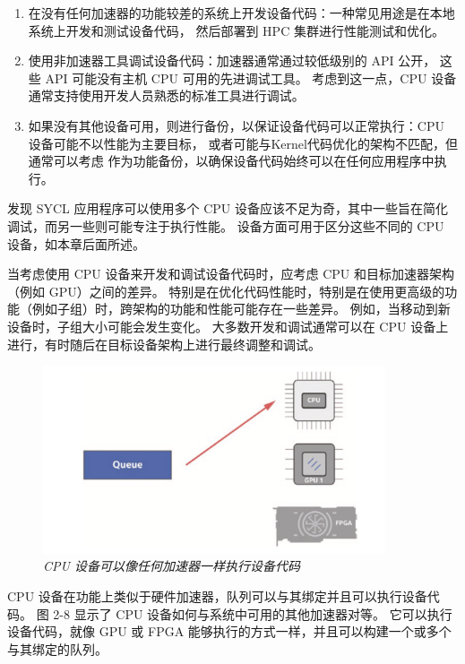 \begin{enumerate}
	\item 在没有任何加速器的功能较差的系统上开发设备代码：一种常见用途是在本地系统上开发和测试设备代码，
	然后部署到 HPC 集群进行性能测试和优化。

	\item 使用非加速器工具调试设备代码：加速器通常通过较低级别的 API 公开，
	这些 API 可能没有主机 CPU 可用的先进调试工具。 考虑到这一点，CPU 设备通常支持使用开发人员熟悉的标准工具进行调试。

	\item 如果没有其他设备可用，则进行备份，以保证设备代码可以正常执行：CPU 设备可能不以性能为主要目标，
	或者可能与Kernel代码优化的架构不匹配，但通常可以考虑 作为功能备份，以确保设备代码始终可以在任何应用程序中执行。
\end{enumerate}

发现 SYCL 应用程序可以使用多个 CPU 设备应该不足为奇，其中一些旨在简化调试，而另一些则可能专注于执行性能。 
设备方面可用于区分这些不同的 CPU 设备，如本章后面所述。

当考虑使用 CPU 设备来开发和调试设备代码时，应考虑 CPU 和目标加速器架构（例如 GPU）之间的差异。 
特别是在优化代码性能时，特别是在使用更高级的功能（例如子组）时，跨架构的功能和性能可能存在一些差异。 
例如，当移动到新设备时，子组大小可能会发生变化。 
大多数开发和调试通常可以在 CPU 设备上进行，有时随后在目标设备架构上进行最终调整和调试。

\begin{figure}[H]
	\centering
	\includegraphics[width=0.9\textwidth]{figs/F2.8.png}
	\caption{\textit{CPU 设备可以像任何加速器一样执行设备代码}}
\end{figure}

CPU 设备在功能上类似于硬件加速器，队列可以与其绑定并且可以执行设备代码。 
图 2-8 显示了 CPU 设备如何与系统中可用的其他加速器对等。 
它可以执行设备代码，就像 GPU 或 FPGA 能够执行的方式一样，并且可以构建一个或多个与其绑定的队列。

